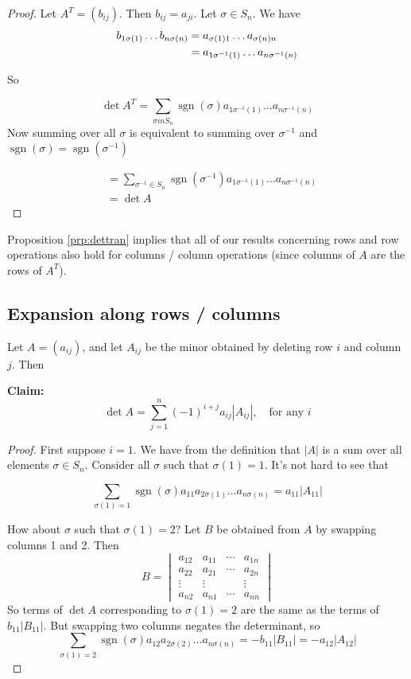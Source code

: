 \documentclass{article}
\theoremstyle{definition} \newtheorem*{definition}{Definition}
\DeclareMathOperator{\sgn}{sgn} \DeclareMathOperator{\id}{id}
\begin{document}
\begin{proof} Let $A^T = (b_{ij})$. Then $b_{ij} = a_{ji}$. Let $\sigma \in
  S_n$. We have \begin{align*} b_{{1}\sigma(1)} \dots b_{{n}\sigma(n)} &=
    a_{\sigma(1)1} \dots a_{\sigma(n)n} \\ &= a_{1\sigma^{-1}(1)}\dots a_{n
      \sigma^{-1}(n)} \end{align*}

So 

\[ \det A^T = \sum_{\sigma in S_n}\sgn(\sigma)  a_{1\sigma^{-1}(1)}\dots a_{n
\sigma^{-1}(n)} \] Now summing over all $\sigma$ is equivalent to summing over
$\sigma^{-1}$ and $\sgn(\sigma) = \sgn(\sigma^{-1})$

\begin{align*} &= \sum_{\sigma^{-1} \in S_n}\sgn
  (\sigma^{-1})a_{1\sigma^{-1}(1)}\dots a_{n \sigma^{-1}(n)}\\ &= \det A
\end{align*} \end{proof} Proposition \ref{prp:dettran}  implies that all of our
results concerning rows and row operations also hold for columns / column
operations (since columns of $A$ are the rows of $A^T$).

\subsection*{Expansion along rows / columns} Let $A = (a_{ij} )$, and let
$A_{ij}$ be the minor obtained by deleting row $i$ and column $j$. Then

\textbf{Claim:} \[ \det A = \sum_{j=1}^n (-1)^{i+j}a_{ij}|A_{ij}|, \quad
\text{for any } i \]

\begin{proof} First suppose $i = 1$. We have from the definition that $|A|$ is
  a sum over all elements $\sigma \in S_n$. Consider all $\sigma$ such that
  $\sigma(1) = 1$. It's not hard to see that

  \[ \sum_{\sigma(1)=1}\sgn(\sigma)a_{11}a_{2\sigma(1)}\dots a_{n\sigma(n)} =
  a_{11}|A_{11}| \]

  How about $\sigma$ such that $\sigma(1) = 2$? Let $B$ be obtained from $A$ by
  swapping columns 1 and 2. Then \[ B = \begin{vmatrix} a_{12} & a_{11} &
      \cdots & a_{1n} \\ a_{22} & a_{21} & \cdots & a_{2n} \\ \vdots & \vdots &
      & \vdots  \\ a_{n2} & a_{n1} & \cdots & a_{nn} \end{vmatrix} \] So terms
    of $\det A$ corresponding to $\sigma(1) = 2$ are the same as the terms of
    $b_{11}|B_{11}|$. But swapping two columns negates the determinant, so \[
      \sum_{\sigma(1)=2}\sgn (\sigma) a_{12}a_{2\sigma(2)} \dots a_{n\sigma(n)}
      = -b_{11}|B_{11}| = -a_{12}|A_{12}| \] \end{proof} 
    
\end{document}
